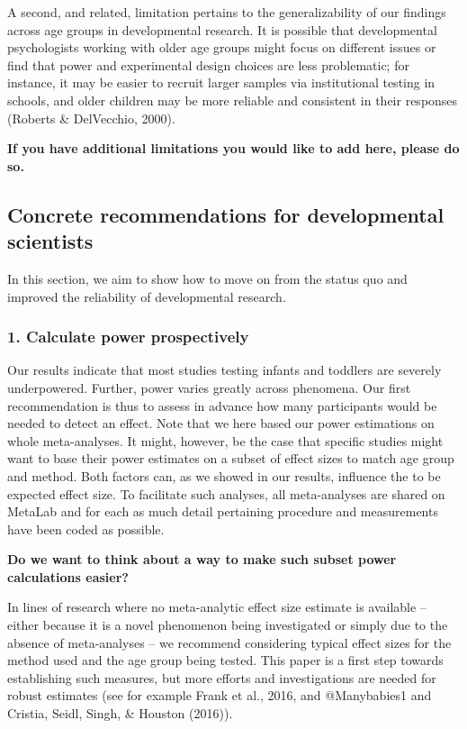 \documentclass[english,floatsintext,man]{apa6}
\begin{document}
A second, and related, limitation pertains to the generalizability of
our findings across age groups in developmental research. It is possible
that developmental psychologists working with older age groups might
focus on different issues or find that power and experimental design
choices are less problematic; for instance, it may be easier to recruit
larger samples via institutional testing in schools, and older children
may be more reliable and consistent in their responses (Roberts \&
DelVecchio, 2000).

\textbf{If you have additional limitations you would like to add here,
please do so.}

\subsection{Concrete recommendations for developmental
scientists}\label{concrete-recommendations-for-developmental-scientists}

In this section, we aim to show how to move on from the status quo and
improved the reliability of developmental research.

\subsubsection{1. Calculate power
prospectively}\label{calculate-power-prospectively}

Our results indicate that most studies testing infants and toddlers are
severely underpowered. Further, power varies greatly across phenomena.
Our first recommendation is thus to assess in advance how many
participants would be needed to detect an effect. Note that we here
based our power estimations on whole meta-analyses. It might, however,
be the case that specific studies might want to base their power
estimates on a subset of effect sizes to match age group and method.
Both factors can, as we showed in our results, influence the to be
expected effect size. To facilitate such analyses, all meta-analyses are
shared on MetaLab and for each as much detail pertaining procedure and
measurements have been coded as possible.

\textbf{Do we want to think about a way to make such subset power
calculations easier?}

In lines of research where no meta-analytic effect size estimate is
available -- either because it is a novel phenomenon being investigated
or simply due to the absence of meta-analyses -- we recommend
considering typical effect sizes for the method used and the age group
being tested. This paper is a first step towards establishing such
measures, but more efforts and investigations are needed for robust
estimates (see for example Frank et al., 2016, and @Manybabies1 and
Cristia, Seidl, Singh, \& Houston (2016)).
\end{document}
